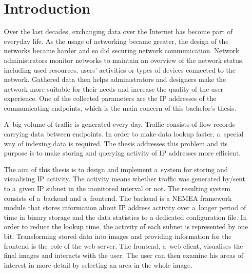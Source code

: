 \setlength{\parindent}{0em}
\setlength{\parskip}{1em}

\csdoublequotesoff

\chapter{Introduction}\label{sec:chapter1}
Over the last decades, exchanging data over the Internet has become part of everyday life.
As the usage of networking became greater, the design of the networks became harder and so did securing network communication.
Network administrators monitor networks to maintain an overview of the network status, including used resources, users' activities or types of devices connected to the network.
Gathered data then helps administrators and designers make the network more suitable for their needs and increase the quality of the user experience. One of the collected parameters
are the IP addresses of the communicating endpoints, which is the main concern of this bachelor's thesis.

A~big volume of traffic is generated every day. Traffic consists of flow records carrying data between endpoints.
In order to make data lookup faster, a~special way of indexing data is required. The thesis addresses this problem and its purpose
is to make storing and querying activity of IP addresses more efficient.

The aim of this thesis is to design and implement a~system for storing and
visualising IP activity. The activity means whether traffic was
generated by/sent to a~given IP subnet in the monitored interval or not.
The resulting system consists of a~backend and a~frontend. The backend
is a NEMEA framework module that stores information about IP address activity
over a~longer period of time in binary storage and the data statistics to
a dedicated configuration file.
In order to reduce the lookup time, the activity of each subnet is represented by one bit.
Transforming stored data into images and providing information for the frontend is the~role of the web server.
The frontend, a~web client, visualises the final images and interacts with the user.
The user can then examine his areas of interest in more detail by
selecting an area in the whole image.

